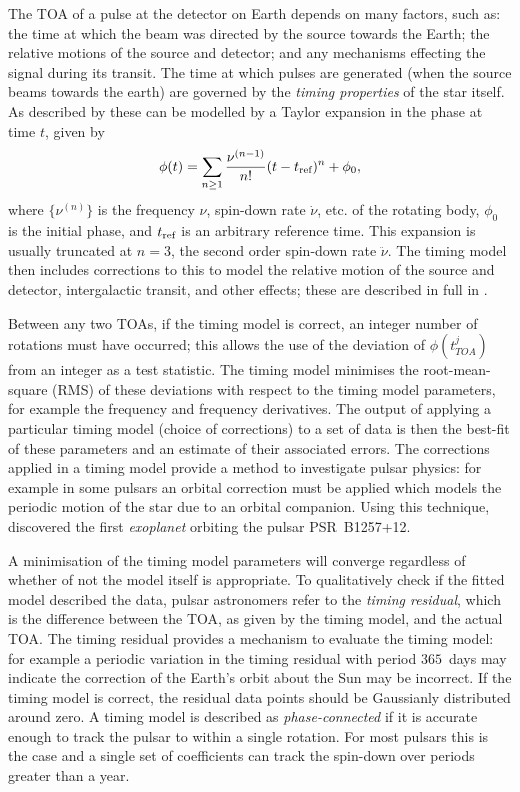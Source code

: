 The TOA of a pulse at the detector on Earth depends on many factors, such as: the
time at which the beam was directed by the source towards the Earth; the relative
motions of the source and detector; and any mechanisms effecting the signal during
its transit. The time at which pulses are generated (when the source beams towards
the earth) are governed by the \emph{timing properties} of the star itself.
As described by \citet{Edwards2006} these can be modelled by a Taylor expansion
in the phase at time $t$, given by
\begin{equation}
\phi(t) = \sum_{n\ge 1}\frac{\nu^{(n-1)}}{n!}(t - t_{\textrm{ref}})^{n} + \phi_{0},
\label{eqn: Taylor compact}
\end{equation} 
where $\{\nu^{(n)}\}$ is the frequency $\nu$, spin-down rate $\dot{\nu}$, etc.
of the rotating body, $\phi_0$ is the initial phase, and $t_{\textrm{ref}}$ is an
arbitrary reference time. This expansion is usually truncated at $n=3$, the
second order spin-down rate $\ddot{\nu}$. The timing model then includes
corrections to this to model the relative motion of the source and detector,
intergalactic transit, and other effects; these are described in full in
\citet{Edwards2006}. 

Between any two TOAs, if the timing model is correct, an integer number of
rotations must have occurred; this allows the use of the deviation of
$\phi(t_{TOA}^{j})$ from an integer as a test statistic. The timing model
minimises the root-mean-square (RMS) of these deviations with respect to the timing model
parameters, for example the frequency and frequency derivatives. The output of
applying a particular timing model (choice of corrections) to a set of data is
then the best-fit of these parameters and an estimate of their associated
errors.  The corrections applied in a timing model provide a method to
investigate pulsar physics: for example in some pulsars an orbital correction
must be applied which models the periodic motion of the star due to an orbital
companion. Using this technique, \citet{wolszczan1992planetary} discovered the
first \emph{exoplanet} orbiting the pulsar PSR~B1257+12.

A minimisation of the timing model parameters will converge regardless of
whether of not the model itself is appropriate. To qualitatively check if the
fitted model described the data, pulsar astronomers refer to the \emph{timing
residual}, which is the difference between the TOA, as given by the timing
model, and the actual TOA. The timing residual provides a mechanism to evaluate
the timing model: for example a periodic variation in the timing residual with period
$365$~days may indicate the correction of the Earth's orbit about the Sun may
be incorrect. If the timing model is correct, the residual data points should
be Gaussianly distributed around zero. A timing model is described as
\emph{phase-connected} if it is accurate enough to track the pulsar to within a
single rotation. For most pulsars this is the case and a single set of
coefficients can track the spin-down over periods greater than a year.

